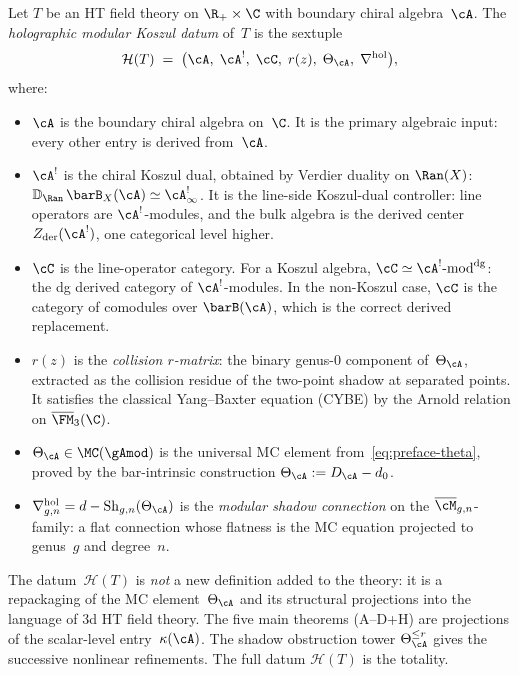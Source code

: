 Let $T$ be an HT field theory on $\R_+\times\C$ with boundary
chiral algebra~$\cA$. The \emph{holographic modular Koszul
datum} of~$T$ is the sextuple
\begin{equation}\label{eq:holo-datum-preface-supp}
\mathcal H(T)
\;=\;
\bigl(
\cA,\;\cA^!,\;\cC,\;r(z),\;\Theta_\cA,\;\nabla^{\mathrm{hol}}
\bigr),
\end{equation}
where:
\begin{itemize}
\item $\cA$ is the boundary chiral algebra on~$\C$. It is the
 primary algebraic input: every other entry is derived
 from~$\cA$.
\item $\cA^!$ is the chiral Koszul dual, obtained by Verdier
 duality on $\Ran(X)$:
 $\mathbb D_{\Ran}\,\barB_X(\cA)\simeq\cA^!_\infty$. It is
 the line-side Koszul-dual controller: line operators are
 $\cA^!$-modules, and the bulk algebra is the derived center
 $Z_{\mathrm{der}}(\cA^!)$, one categorical level higher.
\item $\cC$ is the line-operator category. For a Koszul
 algebra, $\cC\simeq\cA^!\text{-}\mathrm{mod}^{\mathrm{dg}}$:
 the dg derived category of $\cA^!$-modules. In the
 non-Koszul case, $\cC$ is the category of comodules over
 $\barB(\cA)$, which is the correct derived replacement.
\item $r(z)$ is the \emph{collision $r$-matrix}: the binary
 genus-$0$ component of~$\Theta_\cA$, extracted as the
 collision residue of the two-point shadow at separated points.
 It satisfies the classical Yang--Baxter equation (CYBE) by
 the Arnold relation on $\overline{\FM}_3(\C)$.
\item $\Theta_\cA\in\MC(\gAmod)$ is the universal MC element
 from~\eqref{eq:preface-theta}, proved by the bar-intrinsic
 construction $\Theta_\cA:=D_\cA-d_0$.
\item $\nabla^{\mathrm{hol}}_{g,n}
 =d-\mathrm{Sh}_{g,n}(\Theta_\cA)$ is the \emph{modular shadow
 connection} on the $\overline{\cM}_{g,n}$-family: a flat
 connection whose flatness is the MC equation projected to
 genus~$g$ and degree~$n$.
\end{itemize}

The datum~$\mathcal H(T)$ is \emph{not} a new definition added to
the theory: it is a repackaging of the MC element~$\Theta_\cA$ and
its structural projections into the language of 3d HT field theory.
The five main theorems (A--D+H) are projections of the
scalar-level entry~$\kappa(\cA)$. The shadow obstruction tower
$\Theta_\cA^{\le r}$ gives the successive nonlinear refinements.
The full datum $\mathcal H(T)$ is the totality.

